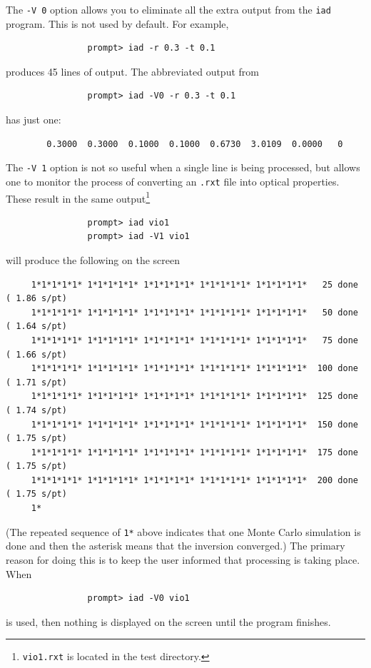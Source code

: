 \documentclass{article}
\newcommand\iadprog{\texttt{iad}}
\begin{document}
The \texttt{-V 0} option allows you to eliminate all the extra output from
the \iadprog{} program.  This is not used by default. For example,
\begin{verbatim}
                prompt> iad -r 0.3 -t 0.1
\end{verbatim}
produces 45 lines of output.  The abbreviated output from
\begin{verbatim}
                prompt> iad -V0 -r 0.3 -t 0.1
\end{verbatim}
has just one:
\begin{verbatim}
        0.3000  0.3000  0.1000  0.1000  0.6730  3.0109  0.0000   0
\end{verbatim}

The \texttt{-V 1} option is not so useful when a single line
is being processed, but allows one to monitor the process of converting
an \texttt{.rxt} file into optical properties.  These result in the same
output\footnote{\texttt{vio1.rxt} is located in the test directory.}
\begin{verbatim}
                prompt> iad vio1
                prompt> iad -V1 vio1
\end{verbatim}
will produce the following on the screen

{\scriptsize\begin{verbatim}
     1*1*1*1*1* 1*1*1*1*1* 1*1*1*1*1* 1*1*1*1*1* 1*1*1*1*1*   25 done ( 1.86 s/pt)
     1*1*1*1*1* 1*1*1*1*1* 1*1*1*1*1* 1*1*1*1*1* 1*1*1*1*1*   50 done ( 1.64 s/pt)
     1*1*1*1*1* 1*1*1*1*1* 1*1*1*1*1* 1*1*1*1*1* 1*1*1*1*1*   75 done ( 1.66 s/pt)
     1*1*1*1*1* 1*1*1*1*1* 1*1*1*1*1* 1*1*1*1*1* 1*1*1*1*1*  100 done ( 1.71 s/pt)
     1*1*1*1*1* 1*1*1*1*1* 1*1*1*1*1* 1*1*1*1*1* 1*1*1*1*1*  125 done ( 1.74 s/pt)
     1*1*1*1*1* 1*1*1*1*1* 1*1*1*1*1* 1*1*1*1*1* 1*1*1*1*1*  150 done ( 1.75 s/pt)
     1*1*1*1*1* 1*1*1*1*1* 1*1*1*1*1* 1*1*1*1*1* 1*1*1*1*1*  175 done ( 1.75 s/pt)
     1*1*1*1*1* 1*1*1*1*1* 1*1*1*1*1* 1*1*1*1*1* 1*1*1*1*1*  200 done ( 1.75 s/pt)
     1*
\end{verbatim}
}

\noindent
(The repeated sequence of \texttt{1*} above indicates that one Monte
Carlo simulation is done and then the asterisk means that the inversion
converged.) The primary reason for doing this is to keep the user informed that processing
is taking place.  When 
\begin{verbatim}
                prompt> iad -V0 vio1
\end{verbatim}
is used, then nothing is displayed on the screen until the program finishes.
\end{document}
